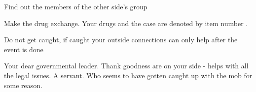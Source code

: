 \documentclass[blue]{guildcamp3}
\begin{document}
\begin{itemz}[Goals]
	\item Find out the members of the other side's group
	\item Make the drug exchange. Your drugs and the case are denoted by item number \iDrugsMagic{}.
	\item Do not get caught, if caught your outside connections can only help after the event is done
\end{itemz}

\begin{members}
	\member{\cNobleTwo{\intro}} Your dear governmental leader. Thank goodness \cNobleTwo{\they} are on your side - helps with all the legal issues. 
	\member{\cServant{\intro}} A servant. Who seems to have gotten caught up with the mob for some reason.
		
	\end{members}
\end{document}
